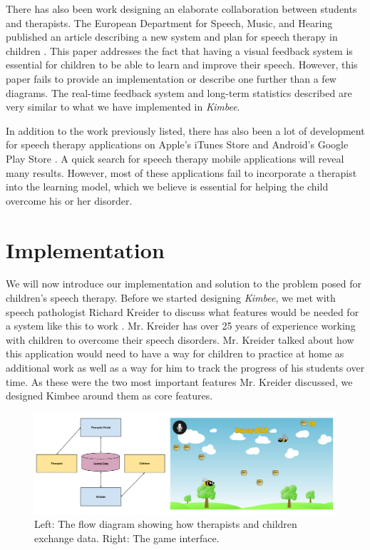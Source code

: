 \documentclass{sig-alternate-2013}
\begin{document}
There has also been work designing an elaborate collaboration between students and therapists. The European Department for Speech, Music, and Hearing published an article describing a new system and plan for speech therapy in children \cite{Oster:EU}. This paper addresses the fact that having a visual feedback system is essential for children to be able to learn and improve their speech. However, this paper fails to provide an implementation or describe one further than a few diagrams. The real-time feedback system and long-term statistics described are very similar to what we have implemented in {\em Kimbee}.

In addition to the work previously listed, there has also been a lot of development for speech therapy applications on Apple's iTunes Store and Android's Google Play Store \cite{Mobile:Apps}. A quick search for speech therapy mobile applications will reveal many results. However, most of these applications fail to incorporate a therapist into the learning model, which we believe is essential for helping the child overcome his or her disorder.

\section{Implementation}

We will now introduce our implementation and solution to the problem posed for children's speech therapy. Before we started designing {\em Kimbee}, we met with speech pathologist Richard Kreider to discuss what features would be needed for a system like this to work \cite{Kreider:Intro}. Mr. Kreider has over 25 years of experience working with children to overcome their speech disorders. Mr. Kreider talked about how this application would need to have a way for children to practice at home as additional work as well as a way for him to track the progress of his students over time. As these were the two most important features Mr. Kreider discussed, we designed Kimbee around them as core features.

\begin{figure}[t]
  \centering
  \includegraphics[keepaspectratio, width=\textwidth]{user_figure.png}
  \vspace{-26 pt}
  \caption{\normalfont Left: The flow diagram showing how therapists and children exchange data. Right: The game interface.}
  \label{fig:user}
\end{figure}
\end{document}
